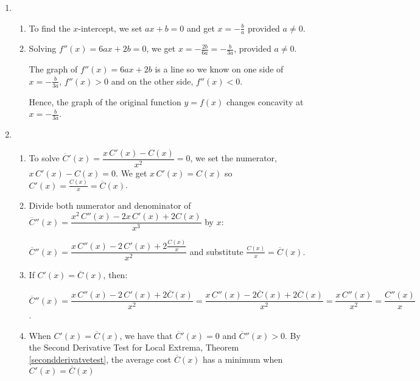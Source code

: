 \documentclass{ximera}
\begin{document}
\begin{enumerate}
\setcounter{enumi}{\value{HW}}

\item  \begin{enumerate}  \item To find the $x$-intercept, we set $ax+b = 0$  and get $x = -\frac{b}{a}$ provided $a \neq 0$.

\item  Solving  $f''(x) = 6ax + 2b = 0$, we get $x = -\frac{2b}{6a} = - \frac{b}{3a}$, provided $a \neq 0$.  

\smallskip

The graph of $f''(x) =  6ax + 2b$ is a line so we know on one side of $x= - \frac{b}{3a}$, $f''(x) > 0$ and on the other side, $f''(x) < 0$.  

\smallskip

Hence, the graph of the original function $y = f(x)$ changes concavity at $x = -\frac{b}{3a}$.

\end{enumerate}

\item\begin{enumerate}  \item  To solve $\overline{C}'(x) = \dfrac{x \, C'(x) - C(x)}{x^2} = 0$, we set the numerator,  $x \, C'(x) - C(x) = 0$. We get  $x \, C'(x)  = C(x)$ so $C'(x) = \frac{C(x)}{x} = \overline{C}(x)$.

\smallskip

\item  Divide both numerator and denominator of  $\overline{C}''(x) = \dfrac{x^2 \, C''(x) - 2x\, C'(x) + 2C(x)}{x^3}$ by $x$: 

\smallskip

$\overline{C}''(x) = \dfrac{x \, C''(x) - 2 \, C'(x) + 2\frac{C(x)}{x}}{x^2}$ and substitute  $\frac{C(x)}{x} = \overline{C}(x)$.

\smallskip

\item  If  $C'(x) = \overline{C}(x)$, then:

\smallskip

 $\overline{C}''(x)  = \dfrac{x\, C''(x) - 2\, C'(x) + 2\overline{C}(x)}{x^2} =  \dfrac{x\, C''(x) - 2\overline{C} (x) + 2\overline{C}(x)}{x^2}= \dfrac{x\, C''(x)}{x^2} =  \dfrac{C''(x)}{x}$.

\smallskip

\item  When $C'(x) = \overline{C}(x)$, we have that $\overline{C}'(x) = 0$ and $\overline{C}''(x) > 0$.  By the Second Derivative Test for Local Extrema,  Theorem \ref{secondderivatvetest}, the average cost $\overline{C}(x)$ has a minimum when $C'(x) = \overline{C}(x)$ 


\end{enumerate}
\end{enumerate}
\end{document}
